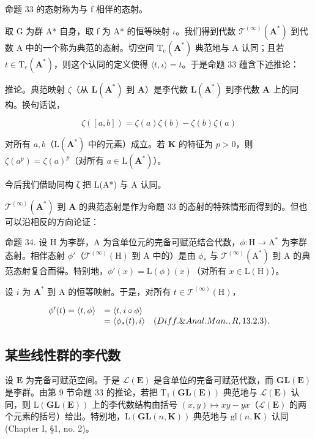 命题 33 的态射称为与 f 相伴的态射。

取 G 为群 A* 自身，取 f 为 A* 的恒等映射 \(\iota\)。我们得到代数 \(\mathcal{T}^{(\infty)}(\mathbf{A}^*)\) 到代数 A 中的一个称为典范的态射。切空间 \(\mathrm{T}_{e}(\mathbf{A}^*)\) 典范地与 A 认同；且若 \(t \in \mathrm{T}_{e}(\mathbf{A}^*)\)，则这个认同的定义使得 \(\langle t, \iota \rangle = t\)。于是命题 33 蕴含下述推论：

推论。典范映射 \(\zeta\)（从 \(\mathbf{L}(\mathbf{A}^{*})\) 到 \(\mathbf{A}\)）是李代数 \(\mathbf{L}(\mathbf{A}^{*})\) 到李代数 \(\mathbf{A}\) 上的同构。换句话说，

\[
\zeta ([ a, b ]) = \zeta (a) \zeta (b) - \zeta (b) \zeta (a)
\]

对所有 \(a, b\)（\(\mathrm{L}(\mathbf{A}^*)\) 中的元素）成立。若 \(\mathbf{K}\) 的特征为 \(p > 0\)，则 \(\zeta(a^p) = \zeta(a)^p\)（对所有 \(a \in \mathrm{L}(\mathbf{A}^*)\)）。

今后我们借助同构 ζ 把 L(A*) 与 A 认同。

\(\mathcal{T}^{(\infty)}(\mathbf{A}^*)\) 到 \(\mathbf{A}\) 的典范态射是作为命题 33 的态射的特殊情形而得到的。但也可以沿相反的方向论证：

命题 34. 设 H 为李群，A 为含单位元的完备可赋范结合代数，\(\phi: \mathrm{H} \to \mathrm{A}^*\) 为李群态射。相伴态射 \(\phi'\)（\(\mathcal{T}^{(\infty)}(\mathrm{H})\) 到 A 中的）是由 \(\phi_*\) 与 \(\mathcal{T}^{(\infty)}(\mathrm{A}^*)\) 到 A 的典范态射复合而得。特别地，\(\phi'(x) = \mathrm{L}(\phi)(x)\)（对所有 \(x \in \mathrm{L}(\mathrm{H})\)）。

设 \(i\) 为 \(\mathbf{A}^*\) 到 A 的恒等映射。于是，对所有 \(t\in \mathcal{T}^{(\infty)}(\mathrm{H})\)，

\[
\begin{array}{r l} \phi^ {\prime} (t) = \langle t, \phi \rangle & = \langle t, i \circ \phi \rangle \\ & = \langle \phi_ {*} (t), i \rangle \quad (Diff. \& Anal. Man., R, 13.2.3). \end{array}
\]

\subsection{某些线性群的李代数}

设 \(\mathbf{E}\) 为完备可赋范空间。于是 \(\mathcal{L}(\mathbf{E})\) 是含单位的完备可赋范代数，而 \(\mathbf{GL}(\mathbf{E})\) 是李群。由第 9 节命题 33 的推论，若把 \(\mathrm{T}_{1}(\mathbf{GL}(\mathbf{E}))\) 典范地与 \(\mathcal{L}(\mathbf{E})\) 认同，则 \(\mathrm{L}(\mathbf{GL}(\mathbf{E}))\) 上的李代数结构由括号 \((x,y)\mapsto xy - yx\)（\(\mathcal{L}(\mathbf{E})\) 的两个元素的括号）给出。特别地，\(\mathrm{L}(\mathbf{GL}(n,\mathbf{K}))\) 典范地与 \(\mathrm{gl}(n,\mathbf{K})\) 认同 (Chapter I, §1, no. 2)。

